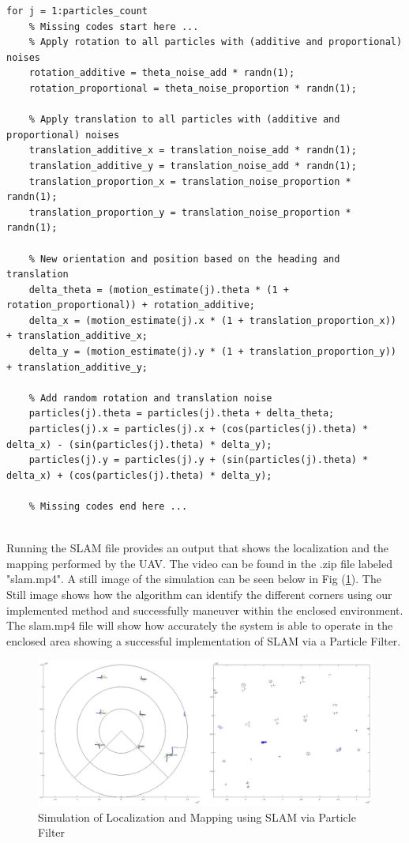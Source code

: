 \begin{lstlisting}
for j = 1:particles_count		
    % Missing codes start here ...
    % Apply rotation to all particles with (additive and proportional) noises 
    rotation_additive = theta_noise_add * randn(1);
    rotation_proportional = theta_noise_proportion * randn(1);

    % Apply translation to all particles with (additive and proportional) noises 
    translation_additive_x = translation_noise_add * randn(1);
    translation_additive_y = translation_noise_add * randn(1);
    translation_proportion_x = translation_noise_proportion * randn(1);
    translation_proportion_y = translation_noise_proportion * randn(1);
        
    % New orientation and position based on the heading and translation
    delta_theta = (motion_estimate(j).theta * (1 + rotation_proportional)) + rotation_additive;
    delta_x = (motion_estimate(j).x * (1 + translation_proportion_x)) + translation_additive_x;
    delta_y = (motion_estimate(j).y * (1 + translation_proportion_y)) + translation_additive_y;
        
    % Add random rotation and translation noise
    particles(j).theta = particles(j).theta + delta_theta;
    particles(j).x = particles(j).x + (cos(particles(j).theta) * delta_x) - (sin(particles(j).theta) * delta_y);
    particles(j).y = particles(j).y + (sin(particles(j).theta) * delta_x) + (cos(particles(j).theta) * delta_y);

    % Missing codes end here ...
\end{lstlisting}
\label{fig:SLAM}
\\
Running the SLAM file provides an output that shows the localization and the mapping performed by the UAV. The video can be found in the .zip file labeled "slam.mp4". A still image of the simulation can be seen below in Fig (\ref{fig:SLAMSim}). The Still image shows how the algorithm can identify the different corners using our implemented method and successfully maneuver within the enclosed environment. The slam.mp4 file will show how accurately the system is able to operate in the enclosed area showing a successful implementation of SLAM via a Particle Filter.\\
\begin{figure}[H]
  \centering
 \includegraphics[width=1\linewidth, height=0.7\linewidth]{FastSLAM/SLAMsim.png}  
\caption{Simulation of Localization and Mapping using SLAM via Particle Filter}
\label{fig:SLAMSim}
\end{figure}